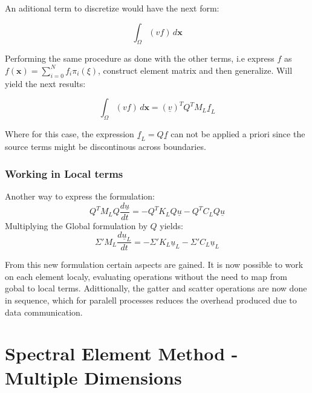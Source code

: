 \documentclass[
  a4paper,
  10pt]{article}
\begin{document}
An aditional term to discretize would have the next form:

\begin{equation}
        \int_{\Omega} (v f) \,d\textbf{x}        
\end{equation}

Performing the same procedure as done with the other terms, i.e express
\(f\) as \(f(\textbf{x})=\sum_{i=0}^{N}f_{i} \pi_{i}(\xi)\), construct
element matrix and then generalize. Will yield the next results:

\begin{equation}
        \int_{\Omega} (v f) \,d\textbf{x} = (\underline{v})^{T}Q^{T}M_L\underline{f}_L        
\end{equation}

Where for this case, the expression \(\underline{f}_L=Q\underline{f}\)
can not be applied a priori since the source terms might be discontinous
across boundaries.

\hypertarget{working-in-local-terms}{%
\subsubsection{Working in Local terms}\label{working-in-local-terms}}

Another way to express the formulation: \begin{equation}
         Q^{T}M_{L}Q\frac{d\underline{u}}{dt} = - Q^{T}K_LQ\underline{u} - Q^{T}C_LQ\underline{u}    
\end{equation} Multiplying the Global formulation by \(Q\) yields:
\begin{equation}
         \Sigma' M_{L}\frac{d\underline{u}_{L}}{dt} = - \Sigma'K_L\underline{u}_L - \Sigma'C_L\underline{u}_L    
\end{equation}

From this new formulation certain aspects are gained. It is now possible
to work on each element localy, evaluating operations without the need
to map from gobal to local terms. Adittionally, the gatter and scatter
operations are now done in sequence, which for paralell processes
reduces the overhead produced due to data communication.

\hypertarget{spectral-element-method---multiple-dimensions}{%
\section{Spectral Element Method - Multiple
Dimensions}\label{spectral-element-method---multiple-dimensions}}
\end{document}
